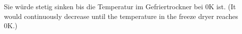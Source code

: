 Sie würde stetig sinken bis die Temperatur im Gefriertrockner bei 0K ist.  
(It would continuously decrease until the temperature in the freeze dryer reaches 0K.)
